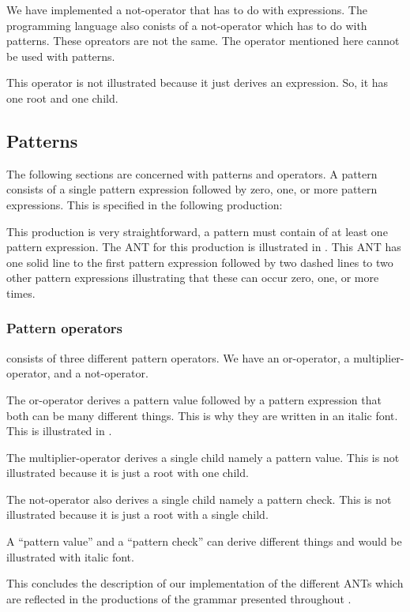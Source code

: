We have implemented a not-operator that has to do with expressions. The programming
language also conists of a not-operator which has to do with patterns. These
opreators are not the same. The operator mentioned here cannot be used with
patterns. 

This operator is not illustrated because it just derives an expression. So, it 
has one root and one child.

\subsection{Patterns}

The following sections are concerned with patterns and operators. A pattern
consists of a single pattern expression followed by zero, one, or more pattern
expressions.  This is specified in the following production:

\begin{ebnf}
\end{ebnf}

This production is very straightforward, a pattern must contain of at least one
pattern expression. The ANT for this production is illustrated in
. This ANT has one solid line to the first pattern
expression followed by two dashed lines to two other pattern expressions
illustrating that these can occur zero, one, or more times.



\subsubsection{Pattern operators}

\productname{} consists of three different pattern operators. We have an
or-operator, a multiplier-operator, and a not-operator.

The or-operator derives a pattern value followed by a pattern expression that
both can be many different things. This is why they are written in an italic
font. This is illustrated in .



The multiplier-operator derives a single child namely a pattern value. This is
not illustrated because it is just a root with one child.

The not-operator also derives a single child namely a pattern check. This is not
illustrated because it is just a root with a single child.

A ``pattern value'' and a ``pattern check'' can derive different things and
would be illustrated with italic font.

This concludes the description of our implementation of the different ANTs which 
are reflected in the productions of the grammar presented throughout
.

